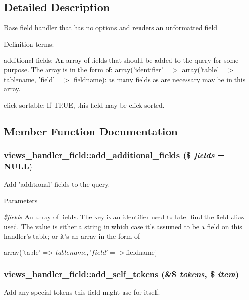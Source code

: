 \subsection{Detailed Description}
Base field handler that has no options and renders an unformatted field.

Definition terms:
\begin{DoxyItemize}
\item additional fields: An array of fields that should be added to the query for some purpose. The array is in the form of: array('identifier' =$>$ array('table' =$>$ tablename, 'field' =$>$ fieldname); as many fields as are necessary may be in this array.
\item click sortable: If TRUE, this field may be click sorted. 
\end{DoxyItemize}

\subsection{Member Function Documentation}
\hypertarget{classviews__handler__field_a1590869371ef24a211e591a07ed5f7cb}{
\subsubsection[{add\_\-additional\_\-fields}]{\setlength{\rightskip}{0pt plus 5cm}views\_\-handler\_\-field::add\_\-additional\_\-fields (\$ {\em fields} = {\ttfamily NULL})}}
\label{classviews__handler__field_a1590869371ef24a211e591a07ed5f7cb}
Add 'additional' fields to the query.


\begin{DoxyParams}{Parameters}
\item[{\em \$fields}]An array of fields. The key is an identifier used to later find the field alias used. The value is either a string in which case it's assumed to be a field on this handler's table; or it's an array in the form of 
\begin{DoxyCode}
 array('table' => $tablename, 'field' => $fieldname) 
\end{DoxyCode}
 \end{DoxyParams}
\hypertarget{classviews__handler__field_ac61cc83a4c8c579993a254b5b1e16cbc}{
\subsubsection[{add\_\-self\_\-tokens}]{\setlength{\rightskip}{0pt plus 5cm}views\_\-handler\_\-field::add\_\-self\_\-tokens (\&\$ {\em tokens}, \/  \$ {\em item})}}
\label{classviews__handler__field_ac61cc83a4c8c579993a254b5b1e16cbc}
Add any special tokens this field might use for itself.

